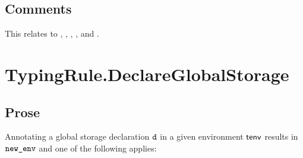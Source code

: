 \documentclass{book}
\begin{document}
\subsection{Comments}

This relates to , , , , and .

\section{TypingRule.DeclareGlobalStorage \label{sec:TypingRule.DeclareGlobalStorage}}
\subsection{Prose}
Annotating a global storage declaration $\texttt{d}$ in a given environment $\textsf{tenv}$ results
in $\texttt{new\_env}$ and one of the following applies:
\end{document}
